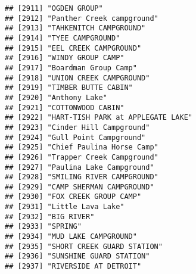 \documentclass[
]{article}
\begin{document}
\begin{verbatim}
## [2911] "OGDEN GROUP"                                                                         
## [2912] "Panther Creek campground"                                                            
## [2913] "TAHKENITCH CAMPGROUND"                                                               
## [2914] "TYEE CAMPGROUND"                                                                     
## [2915] "EEL CREEK CAMPGROUND"                                                                
## [2916] "WINDY GROUP CAMP"                                                                    
## [2917] "Boardman Group Camp"                                                                 
## [2918] "UNION CREEK CAMPGROUND"                                                              
## [2919] "TIMBER BUTTE CABIN"                                                                  
## [2920] "Anthony Lake"                                                                        
## [2921] "COTTONWOOD CABIN"                                                                    
## [2922] "HART-TISH PARK at APPLEGATE LAKE"                                                    
## [2923] "Cinder Hill Campground"                                                              
## [2924] "Gull Point Campground"                                                               
## [2925] "Chief Paulina Horse Camp"                                                            
## [2926] "Trapper Creek Campground"                                                            
## [2927] "Paulina Lake Campground"                                                             
## [2928] "SMILING RIVER CAMPGROUND"                                                            
## [2929] "CAMP SHERMAN CAMPGROUND"                                                             
## [2930] "FOX CREEK GROUP CAMP"                                                                
## [2931] "Little Lava Lake"                                                                    
## [2932] "BIG RIVER"                                                                           
## [2933] "SPRING"                                                                              
## [2934] "MUD LAKE CAMPGROUND"                                                                 
## [2935] "SHORT CREEK GUARD STATION"                                                           
## [2936] "SUNSHINE GUARD STATION"                                                              
## [2937] "RIVERSIDE AT DETROIT"                                                                

\end{verbatim}
\end{document}
